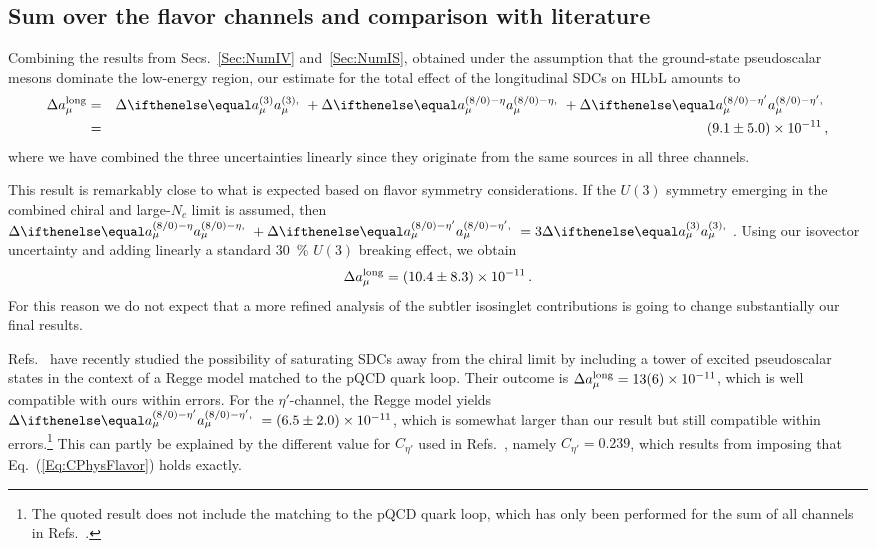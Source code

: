 
\subsection{Sum over the flavor channels and comparison with literature}
\label{Sec:NumResults}
Combining the results from Secs.~\ref{Sec:NumIV} and~\ref{Sec:NumIS}, obtained under the assumption that the ground-state pseudoscalar mesons dominate the low-energy region, our estimate for the total effect of the longitudinal SDCs on HLbL amounts to
\begin{eqnarray}
\Delta \aLon & = &
\Delta \aPion + \Delta \aEta + \Delta \aEtap \nonumber \\
& = & \num[separate-uncertainty]{9.1\pm 5.0 e-11}\, ,
\label{Eq:resultSum}
\end{eqnarray}
where we have combined the three uncertainties linearly since they originate from the same sources in all three channels. 

This result is remarkably close to what is expected based on flavor symmetry considerations. If the $U(3)$ symmetry emerging in the combined chiral and large-$N_c$ limit is assumed, then $\Delta \aEta + \Delta \aEtap = 3 \Delta \aPion$. Using our isovector uncertainty and adding linearly a standard \SI{30}{\percent} $U(3)$ breaking effect, we obtain
\begin{equation}
\Delta \aLon = \num[separate-uncertainty]{10.4 \pm 8.3e-11}\,.
\end{equation}
For this reason we do not expect that a more refined analysis of the subtler isosinglet contributions is going to change substantially our final results.

Refs.~\cite{BernSDCShort,BernSDCLong} have recently studied the possibility of saturating SDCs away from the chiral limit by including a tower of excited pseudoscalar states in the context of a Regge model matched to the pQCD quark loop. Their outcome is $\Delta \aLon = \num{13 \pm 6 e-11}$, which is well compatible with ours within errors. For the $\eta'$-channel, the Regge model yields $\Delta \aEtap = \num[separate-uncertainty]{6.5\pm 2.0 e-11}$, which is somewhat larger than our result but still compatible within errors.\footnote{The quoted result does not include the matching to the pQCD quark loop, which has only been performed for the sum of all channels in Refs.~\cite{BernSDCShort,BernSDCLong}.} This can partly be explained by the different value for $C_{\eta'}$ used in Refs.~\cite{BernSDCShort,BernSDCLong}, namely $C_{\eta'} = 0.239$, which results from imposing that Eq.~(\ref{Eq:CPhysFlavor}) holds exactly. 

